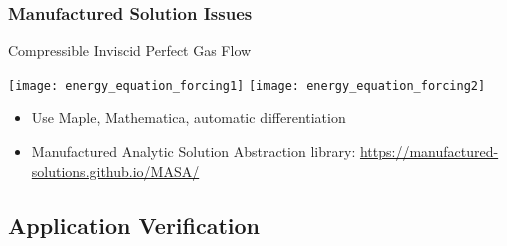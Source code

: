 \begin{frame}
\frametitle{Manufactured Solution Issues}
\begin{block}{Compressible Inviscid Perfect Gas Flow}

\texttt{[image: energy\_equation\_forcing1]}
\texttt{[image: energy\_equation\_forcing2]}

\end{block}

\begin{itemize}
\item Use Maple, Mathematica, automatic differentiation
\item Manufactured Analytic Solution Abstraction library:
      \url{https://manufactured-solutions.github.io/MASA/}
\end{itemize}

\end{frame}

\subsection{Application Verification}

